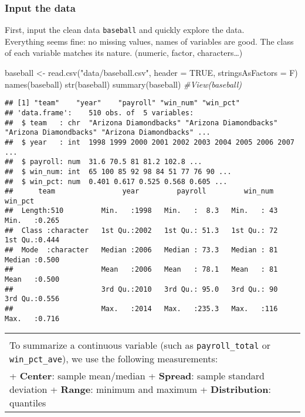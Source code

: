 \documentclass[
]{article}
\newenvironment{Shaded}{\begin{snugshade}}{\end{snugshade}}
\newcommand{\AttributeTok}[1]{\textcolor[rgb]{0.77,0.63,0.00}{#1}}
\newcommand{\CommentTok}[1]{\textcolor[rgb]{0.56,0.35,0.01}{\textit{#1}}}
\newcommand{\ConstantTok}[1]{\textcolor[rgb]{0.00,0.00,0.00}{#1}}
\newcommand{\FunctionTok}[1]{\textcolor[rgb]{0.00,0.00,0.00}{#1}}
\newcommand{\NormalTok}[1]{#1}
\newcommand{\OtherTok}[1]{\textcolor[rgb]{0.56,0.35,0.01}{#1}}
\newcommand{\StringTok}[1]{\textcolor[rgb]{0.31,0.60,0.02}{#1}}
\begin{document}
\frametitle{Input the data}

First, input the clean data \texttt{baseball} and quickly explore the
data.\\
Everything seems fine: no missing values, names of variables are good.
The class of each variable matches its nature. (numeric, factor,
characters\ldots)\\
\tiny

\begin{Shaded}
\begin{Highlighting}[]
\NormalTok{baseball }\OtherTok{\textless{}{-}} \FunctionTok{read.csv}\NormalTok{(}\StringTok{"data/baseball.csv"}\NormalTok{, }\AttributeTok{header =} \ConstantTok{TRUE}\NormalTok{, }\AttributeTok{stringsAsFactors =}\NormalTok{ F)}
\FunctionTok{names}\NormalTok{(baseball)}
\FunctionTok{str}\NormalTok{(baseball)}
\FunctionTok{summary}\NormalTok{(baseball)}
\CommentTok{\#View(baseball)}
\end{Highlighting}
\end{Shaded}

\begin{verbatim}
## [1] "team"    "year"    "payroll" "win_num" "win_pct"
## 'data.frame':    510 obs. of  5 variables:
##  $ team   : chr  "Arizona Diamondbacks" "Arizona Diamondbacks" "Arizona Diamondbacks" "Arizona Diamondbacks" ...
##  $ year   : int  1998 1999 2000 2001 2002 2003 2004 2005 2006 2007 ...
##  $ payroll: num  31.6 70.5 81 81.2 102.8 ...
##  $ win_num: int  65 100 85 92 98 84 51 77 76 90 ...
##  $ win_pct: num  0.401 0.617 0.525 0.568 0.605 ...
##      team                year         payroll         win_num       win_pct     
##  Length:510         Min.   :1998   Min.   :  8.3   Min.   : 43   Min.   :0.265  
##  Class :character   1st Qu.:2002   1st Qu.: 51.3   1st Qu.: 72   1st Qu.:0.444  
##  Mode  :character   Median :2006   Median : 73.3   Median : 81   Median :0.500  
##                     Mean   :2006   Mean   : 78.1   Mean   : 81   Mean   :0.500  
##                     3rd Qu.:2010   3rd Qu.: 95.0   3rd Qu.: 90   3rd Qu.:0.556  
##                     Max.   :2014   Max.   :235.3   Max.   :116   Max.   :0.716
\end{verbatim}

\begin{longtable}[]{@{}
  >{\raggedright\arraybackslash}p{}@{}}
\toprule
\endhead
 \\
To summarize a continuous variable (such as \texttt{payroll\_total} or
\texttt{win\_pct\_ave}), we use the following measurements: \\
+ \textbf{Center}: sample mean/median + \textbf{Spread}: sample standard
deviation + \textbf{Range}: minimum and maximum + \textbf{Distribution}:
quantiles \\
\bottomrule
\end{longtable}
\end{document}
